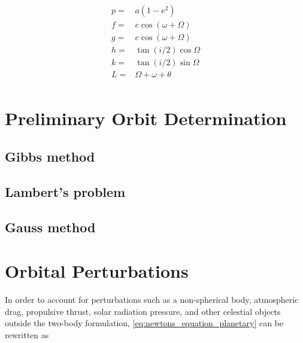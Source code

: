 \begin{equation}
    \begin{aligned}
        p=&a(1-e^2)\\
        f=&e\cos{(\omega+\Omega)}\\
        g=&e\cos{(\omega+\Omega)}\\
        h=&\tan{(i/2)}\cos{\Omega}\\
        k=&\tan{(i/2)}\sin{\Omega}\\
        L=&\Omega+\omega+\theta\\
    \end{aligned}
\end{equation}

\cite{Equinoctial}

\section{Preliminary Orbit Determination}

\subsection{Gibbs method}

\subsection{Lambert's problem}

\subsection{Gauss method}

\section{Orbital Perturbations}
In order to account for perturbations such as a non-spherical body, atmospheric
drag, propulsive thrust, solar radiation pressure, and other celestial objects
outside the two-body formulation, \autoref{eq:newtons_equation_planetary} can be
rewritten as

